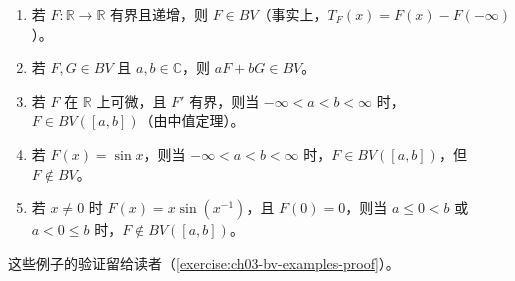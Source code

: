 \documentclass[../../main.tex]{subfiles}%
\begin{document}
\begin{examples}\label{examples:ch03-bv-examples}
\begin{enumerate}
\item\label{item:ch03-bv-bounded-monotone} 若 $F:\mathbb R\to\mathbb R$ 有界且递增，则 $F\in BV$（事实上，$T_F(x)=F(x)-F(-\infty)$）。
\item\label{item:ch03-bv-linear} 若 $F,G\in BV$ 且 $a,b\in\mathbb C$，则 $aF+bG\in BV$。
\item\label{item:ch03-bv-bounded-derivative} 若 $F$ 在 $\mathbb R$ 上可微，且 $F'$ 有界，则当 $-\infty<a<b<\infty$ 时，$F\in BV([a,b])$（由中值定理）。
\item\label{item:ch03-bv-sine} 若 $F(x)=\sin x$，则当 $-\infty<a<b<\infty$ 时，$F\in BV([a,b])$，但 $F\notin BV$。
\item\label{item:ch03-bv-oscillation} 若 $x\ne0$ 时 $F(x)=x\sin(x^{-1})$，且 $F(0)=0$，则当 $a\le0<b$ 或 $a<0\le b$ 时，$F\notin BV([a,b])$。
\end{enumerate}
\end{examples}
这些例子的验证留给读者（\cref{exercise:ch03-bv-examples-proof}）。
\end{document}
